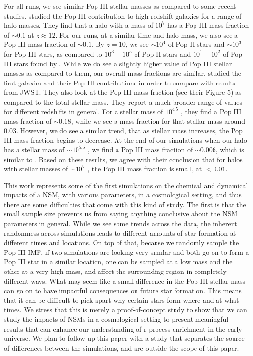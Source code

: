 \documentclass[fleqn,usenatbib]{mnras}
\begin{document}
For all runs, we see similar Pop III stellar masses as compared to some recent studies. \citet{Riaz22} studied the Pop III contribution to high redshift galaxies for a range of halo masses. They find that a halo with a mass of $10^7$ \Ms{} has a Pop III mass fraction of $\sim 0.1$ at $z \approx 12$. For our runs, at a similar time and halo mass, we also see a Pop III mass fraction of $\sim 0.1$. By $z = 10$, we see $\sim 10^{4}$ \Ms{} of Pop II stars and $\sim 10^{3}$ \Ms{} for Pop III stars, as compared to $10^3 - 10^5$ \Ms{} of Pop II stars and  $10^1 - 10^2$ \Ms{} of Pop III stars found by \citet{Riaz22}. While we do see a slightly higher value of Pop III stellar masses as compared to them, our overall mass fractions are similar. \citet{Yajima23} studied the first galaxies and their Pop III contributions in order to compare with results from JWST. They also look at the Pop III mass fraction (see their Figure 5) as compared to the total stellar mass. They report a much broader range of values for different redshifts in general. For a stellar mass of $10^{4.5}$ \Ms, they find a Pop III mass fraction of $\sim 0.18$, while we see a mass fraction for that stellar mass around 0.03. However, we do see a similar trend, that as stellar mass increases, the Pop III mass fraction begins to decrease. At the end of our simulations when our halo has a stellar mass of $\sim 10^{5.5}$ \Ms, we find a Pop III mass fraction of $\sim 0.006$, which is similar to \citet{Yajima23}. Based on these results, we agree with their conclusion that for halos with stellar masses of $\sim 10^{7}$ \Ms, the Pop III mass fraction is small, at $< 0.01$.

This work represents some of the first simulations on the chemical and dynamical impacts of a NSM, with various parameters, in a cosmological setting, and thus there are some difficulties that come with this kind of study. The first is that the small sample size prevents us from saying anything conclusive about the NSM parameters in general. While we see some trends across the data, the inherent randomness across simulations leads to different amounts of star formation at different times and locations. On top of that, because we randomly sample the Pop III IMF, if two simulations are looking very similar and both go on to form a Pop III star in a similar location, one can be sampled at a low mass and the other at a very high mass, and affect the surrounding region in completely different ways. What may seem like a small difference in the Pop III stellar mass can go on to have impactful consequences on future star formation. This means that it can be difficult to pick apart why certain stars form where and at what times. We stress that this is merely a proof-of-concept study to show that we can study the impacts of NSMs in a cosmological setting to present meaningful results that can enhance our understanding of r-process enrichment in the early universe. We plan to follow up this paper with a study that separates the source of differences between the simulations, and are outside the scope of this paper.
\end{document}
